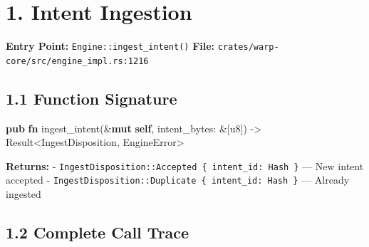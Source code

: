 \documentclass[
]{book}
\newenvironment{Shaded}{}{}
\newcommand{\DataTypeTok}[1]{\textcolor[rgb]{0.56,0.13,0.00}{#1}}
\newcommand{\KeywordTok}[1]{\textcolor[rgb]{0.00,0.44,0.13}{\textbf{#1}}}
\newcommand{\NormalTok}[1]{#1}
\newcommand{\OperatorTok}[1]{\textcolor[rgb]{0.40,0.40,0.40}{#1}}
\begin{document}
\section{1. Intent Ingestion}\label{intent-ingestion}

\textbf{Entry Point:} \texttt{Engine::ingest\_intent()} \textbf{File:}
\texttt{crates/warp-core/src/engine\_impl.rs:1216}

\subsection{1.1 Function Signature}\label{function-signature}

\begin{Shaded}
\begin{Highlighting}[]
\KeywordTok{pub} \KeywordTok{fn}\NormalTok{ ingest\_intent(}\OperatorTok{\&}\KeywordTok{mut} \KeywordTok{self}\OperatorTok{,}\NormalTok{ intent\_bytes}\OperatorTok{:} \OperatorTok{\&}\NormalTok{[}\DataTypeTok{u8}\NormalTok{]) }\OperatorTok{{-}\textgreater{}} \DataTypeTok{Result}\OperatorTok{\textless{}}\NormalTok{IngestDisposition}\OperatorTok{,}\NormalTok{ EngineError}\OperatorTok{\textgreater{}}
\end{Highlighting}
\end{Shaded}

\textbf{Returns:} -
\texttt{IngestDisposition::Accepted\ \{\ intent\_id:\ Hash\ \}} --- New
intent accepted -
\texttt{IngestDisposition::Duplicate\ \{\ intent\_id:\ Hash\ \}} ---
Already ingested

\subsection{1.2 Complete Call Trace}\label{complete-call-trace}
\end{document}
